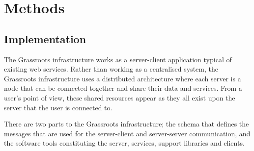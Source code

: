\documentclass[9pt,a4paper]{extarticle}
\begin{document}
\section*{Methods}%
















\subsection*{Implementation}

The Grassroots infrastructure works as a server-client application typical of existing web services. 
Rather than working as a centralised system, the Grassroots infrastructure uses a distributed architecture where each server is a node that can be connected together and share their data and services. 
From a user's point of view, these shared resources appear as they all exist upon the server that the user is connected to.

There are two parts to the Grassroots infrastructure; the schema that defines the messages that are used for the server-client and server-server communication, and the software tools constituting the server, services, support libraries and clients.
\end{document}
